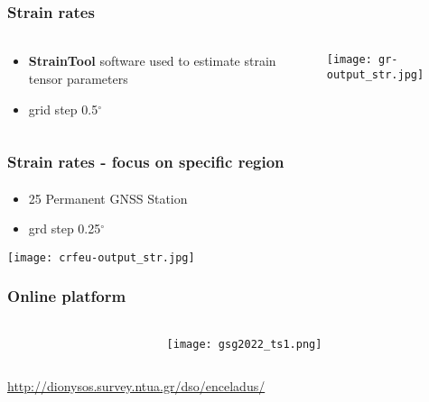 \begin{frame}
  \frametitle{Strain rates}
  \framesubtitle{}
  \label{}
\begin{columns}[T]
  \begin{column}{.3\textwidth}
    \begin{itemize}\setlength\itemsep{1em}
      \item \textbf{StrainTool} software used to estimate strain tensor parameters \citep{straintool}
      \item grid step 0.5$^{\circ}$
    \end{itemize}
  \end{column}
  \begin{column}{.7\textwidth}
    \begin{center}
    \vskip-1.2cm
      \texttt{[image: gr-output\_str.jpg]}
    \end{center}
  \end{column}
\end{columns}
\end{frame}
\note{}

\begin{frame}
  \frametitle{Strain rates - focus on specific region}
  \framesubtitle{}
  \label{}
  \vskip-1cm
\begin{itemize}\setlength\itemsep{.2em}
  \item 25 Permanent GNSS Station
  \item grd step 0.25$^{\circ}$
\end{itemize}
\begin{center}
  \texttt{[image: crfeu-output\_str.jpg]}
\end{center}

\end{frame}
\note{}

\begin{frame}
  \frametitle{Online platform}
  \framesubtitle{}
  \label{}
  \begin{columns}[T]
    \begin{column}{.5\textwidth}
     
    \end{column}
    \begin{column}{.5\textwidth}
      \begin{center}
          \texttt{[image: gsg2022\_ts1.png]}
        \end{center}  
    \end{column}
  \end{columns}
  \begin{center}
    \href{http://dionysos.survey.ntua.gr/dso/enceladus/}{http://dionysos.survey.ntua.gr/dso/enceladus/}
  \end{center}
\end{frame}
\note{}



